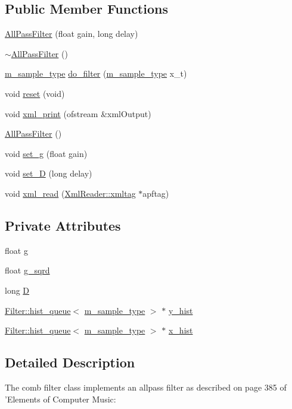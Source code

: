 \subsection*{Public Member Functions}
\begin{CompactItemize}
\item 
\hyperlink{classAllPassFilter_a0}{All\-Pass\-Filter} (float gain, long delay)
\item 
\hyperlink{classAllPassFilter_a1}{$\sim$All\-Pass\-Filter} ()
\item 
\hyperlink{Types_8h_a0}{m\_\-sample\_\-type} \hyperlink{classAllPassFilter_a2}{do\_\-filter} (\hyperlink{Types_8h_a0}{m\_\-sample\_\-type} x\_\-t)
\item 
void \hyperlink{classAllPassFilter_a3}{reset} (void)
\item 
void \hyperlink{classAllPassFilter_a4}{xml\_\-print} (ofstream \&xml\-Output)
\item 
\hyperlink{classAllPassFilter_a5}{All\-Pass\-Filter} ()
\item 
void \hyperlink{classAllPassFilter_a6}{set\_\-g} (float gain)
\item 
void \hyperlink{classAllPassFilter_a7}{set\_\-D} (long delay)
\item 
void \hyperlink{classAllPassFilter_a8}{xml\_\-read} (\hyperlink{classXmlReader_1_1xmltag}{Xml\-Reader::xmltag} $\ast$apftag)
\end{CompactItemize}
\subsection*{Private Attributes}
\begin{CompactItemize}
\item 
float \hyperlink{classAllPassFilter_r0}{g}
\item 
float \hyperlink{classAllPassFilter_r1}{g\_\-sqrd}
\item 
long \hyperlink{classAllPassFilter_r2}{D}
\item 
\hyperlink{classFilter_1_1hist__queue}{Filter::hist\_\-queue}$<$ \hyperlink{Types_8h_a0}{m\_\-sample\_\-type} $>$ $\ast$ \hyperlink{classAllPassFilter_r3}{y\_\-hist}
\item 
\hyperlink{classFilter_1_1hist__queue}{Filter::hist\_\-queue}$<$ \hyperlink{Types_8h_a0}{m\_\-sample\_\-type} $>$ $\ast$ \hyperlink{classAllPassFilter_r4}{x\_\-hist}
\end{CompactItemize}


\subsection{Detailed Description}
The comb filter class implements an allpass filter as described on page 385 of 'Elements of Computer Music:

